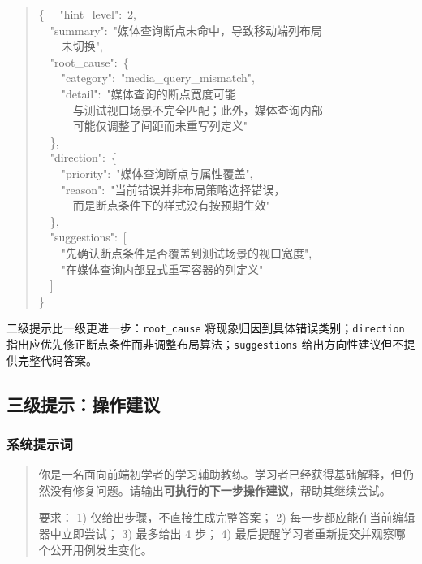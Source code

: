 \begin{appendices}
\begin{quote}\small\ttfamily
\{
\ \ "hint\_level":\ 2,\\
\ \ "summary":\ "媒体查询断点未命中，导致移动端列布局\\
\ \ \ \ 未切换",\\
\ \ "root\_cause":\ \{\\
\ \ \ \ "category":\ "media\_query\_mismatch",\\
\ \ \ \ "detail":\ "媒体查询的断点宽度可能\\
\ \ \ \ \ \ 与测试视口场景不完全匹配；此外，媒体查询内部\\
\ \ \ \ \ \ 可能仅调整了间距而未重写列定义"\\
\ \ \},\\
\ \ "direction":\ \{\\
\ \ \ \ "priority":\ "媒体查询断点与属性覆盖",\\
\ \ \ \ "reason":\ "当前错误并非布局策略选择错误，\\
\ \ \ \ \ \ 而是断点条件下的样式没有按预期生效"\\
\ \ \},\\
\ \ "suggestions":\ [\\
\ \ \ \ "先确认断点条件是否覆盖到测试场景的视口宽度",\\
\ \ \ \ "在媒体查询内部显式重写容器的列定义"\\
\ \ ]\\
\}
\end{quote}

二级提示比一级更进一步：\texttt{root\_cause} 将现象归因到具体错误类别；\texttt{direction} 指出应优先修正断点条件而非调整布局算法；\texttt{suggestions} 给出方向性建议但不提供完整代码答案。

\subsection*{三级提示：操作建议}

\subsubsection*{系统提示词}

\begin{quote}
你是一名面向前端初学者的学习辅助教练。学习者已经获得基础解释，但仍然没有修复问题。请输出\textbf{可执行的下一步操作建议}，帮助其继续尝试。

要求：
1) 仅给出步骤，不直接生成完整答案；
2) 每一步都应能在当前编辑器中立即尝试；
3) 最多给出 4 步；
4) 最后提醒学习者重新提交并观察哪个公开用例发生变化。
\end{quote}


\end{appendices}
